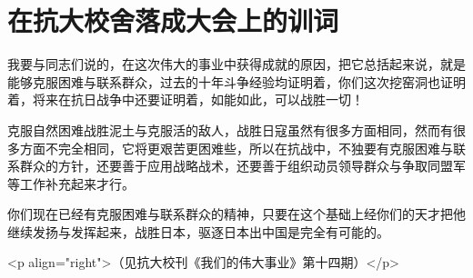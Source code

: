 \section[在抗大校舍落成大会上的训词（一九三七年十月二十四日）]{在抗大校舍落成大会上的训词}


我要与同志们说的，在这次伟大的事业中获得成就的原因，把它总括起来说，就是能够克服困难与联系群众，过去的十年斗争经验均证明着，你们这次挖窑洞也证明着，将来在抗日战争中还要证明着，如能如此，可以战胜一切！

克服自然困难战胜泥土与克服活的敌人，战胜日寇虽然有很多方面相同，然而有很多方面不完全相同，它将更艰苦更困难些，所以在抗战中，不独要有克服困难与联系群众的方针，还要善于应用战略战术，还要善于组织动员领导群众与争取同盟军等工作补充起来才行。

你们现在已经有克服困难与联系群众的精神，只要在这个基础上经你们的天才把他继续发扬与发挥起来，战胜日本，驱逐日本出中国是完全有可能的。

<p align="right">（见抗大校刊《我们的伟大事业》第十四期）</p>

